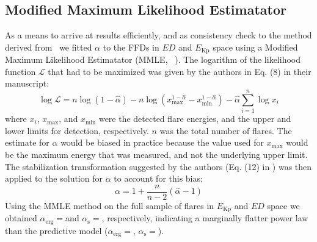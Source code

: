 \documentclass{aa}
\begin{document}
\begin{appendix}
\section{Modified Maximum Likelihood Estimatator}
\label{sec:app:MMLE}
As a means to arrive at results efficiently, and as consistency check to the method derived from~\citet{wheatland_flaresbayes_2004} we fitted $\alpha$ to the FFDs in $ED$ and $E_\mathrm{Kp}$ space using a Modified Maximum Likelihood Estimatator (MMLE,~ \citealt{maschberger2009}). The logarithm of the likelihood function $\mathcal{L}$ that had to be maximized was given by the authors in Eq. (8) in their manuscript:
\begin{equation}
\log \mathcal{L} = n \log (1-\hat{\alpha})-n \log\left(x_\mathrm{max}^{1-\hat{\alpha}}-x_\mathrm{min}^{1-\hat{\alpha}}\right) - \hat{\alpha} \displaystyle\sum_{i=1}^{n}\log x_i
\label{eqn:MLE}
\end{equation}
where $x_i$, $x_\mathrm{max}$, and $x_\mathrm{min}$ were the detected flare energies, and the upper and lower limits for detection, respectively. $n$ was the total number of flares. The estimate for $\alpha$ would be biased in practice because the value used for $x_\mathrm{max}$ would be the maximum energy that was measured, and not the underlying upper limit. The stabilization transformation suggested by the authors (Eq. (12) in \citealt{maschberger2009}) was then applied to the solution for $\alpha$ to account for this bias:
\begin{equation}
\alpha = 1 + \dfrac{n}{n-2}(\hat{\alpha} - 1)
\label{eqn:MLE_stabilize}
\end{equation}
Using the MMLE method on the full sample of flares in $E_\mathrm{Kp}$ and $ED$ space we obtained $\alpha_\mathrm{erg}=$\unskip and $\alpha_\mathrm{s}=$, respectively, indicating a marginally flatter power law than the predictive model ($\alpha_\mathrm{erg}=$, $\alpha_\mathrm{s}=$).

\end{appendix}
\end{document}

